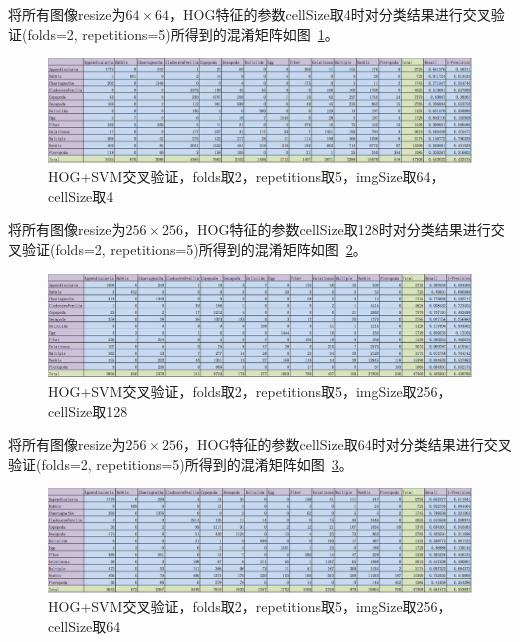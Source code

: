 \documentclass[12pt]{article}
\begin{document}
将所有图像resize为$64 \times 64$，HOG特征的参数cellSize取4时对分类结果进行交叉验证(folds=2, repetitions=5)所得到的混淆矩阵如图~\ref{fig:HOG-SVM-2-folds-5-repetitions-4-64-noNoise}。
\begin{figure}[!ht]
\centering
\includegraphics[width=1.0\linewidth]{HOG-SVM-2-folds-5-repetitions-4-64-noNoise}
\caption{HOG+SVM交叉验证，folds取2，repetitions取5，imgSize取64，cellSize取4}
\label{fig:HOG-SVM-2-folds-5-repetitions-4-64-noNoise}
\end{figure}

将所有图像resize为$256 \times 256$，HOG特征的参数cellSize取128时对分类结果进行交叉验证(folds=2, repetitions=5)所得到的混淆矩阵如图~\ref{fig:HOG-SVM-2-folds-5-repetitions-128-256-noNoise}。
\begin{figure}[!ht]
\centering
\includegraphics[width=1.0\linewidth]{HOG-SVM-2-folds-5-repetitions-128-256-noNoise}
\caption{HOG+SVM交叉验证，folds取2，repetitions取5，imgSize取256，cellSize取128}
\label{fig:HOG-SVM-2-folds-5-repetitions-128-256-noNoise}
\end{figure}

将所有图像resize为$256 \times 256$，HOG特征的参数cellSize取64时对分类结果进行交叉验证(folds=2, repetitions=5)所得到的混淆矩阵如图~\ref{fig:HOG-SVM-2-folds-5-repetitions-64-256-noNoise}。
\begin{figure}[!ht]
\centering
\includegraphics[width=1.0\linewidth]{HOG-SVM-2-folds-5-repetitions-64-256-noNoise}
\caption{HOG+SVM交叉验证，folds取2，repetitions取5，imgSize取256，cellSize取64}
\label{fig:HOG-SVM-2-folds-5-repetitions-64-256-noNoise}
\end{figure}
\end{document}
